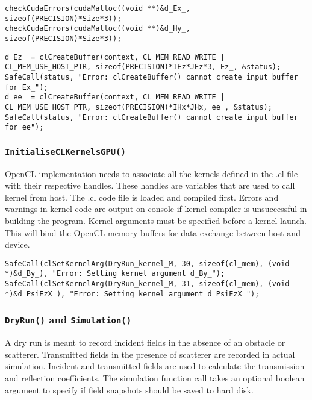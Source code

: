 \label{lst:CUDA-Host-Memory-Allocation}
\SingleSpacing
\begin{lstlisting}[caption={Device memory allocation in CUDA}]
checkCudaErrors(cudaMalloc((void **)&d_Ex_, sizeof(PRECISION)*Size*3));
checkCudaErrors(cudaMalloc((void **)&d_Hy_, sizeof(PRECISION)*Size*3));
\end{lstlisting}
\DoubleSpacing

\label{lst:OpenCL-Device-Memory-Buffers}
\SingleSpacing
\begin{lstlisting}[caption={Device memory allocation in OpenCL}]
d_Ez_ = clCreateBuffer(context, CL_MEM_READ_WRITE | CL_MEM_USE_HOST_PTR, sizeof(PRECISION)*IEz*JEz*3, Ez_, &status);
SafeCall(status, "Error: clCreateBuffer() cannot create input buffer for Ex_");
d_ee_ = clCreateBuffer(context, CL_MEM_READ_WRITE | CL_MEM_USE_HOST_PTR, sizeof(PRECISION)*IHx*JHx, ee_, &status);
SafeCall(status, "Error: clCreateBuffer() cannot create input buffer for ee");
\end{lstlisting}
\DoubleSpacing
\subsubsection{\texttt{InitialiseCLKernelsGPU()}}
OpenCL implementation needs to associate all the kernels defined in the .cl file with their respective handles. These handles are variables that are used to call kernel from host. The .cl code file is loaded and compiled first. Errors and warnings in kernel code are output on console if kernel compiler is unsuccessful in building the program. Kernel arguments must be specified before a kernel launch. This will bind the OpenCL memory buffers for data exchange between host and device.

\label{lst:OpenCL-Setting-Kernel-Arguments}
\SingleSpacing
\begin{lstlisting}[caption={Setting kernel arguments in OpenCL}]
SafeCall(clSetKernelArg(DryRun_kernel_M, 30, sizeof(cl_mem), (void *)&d_By_), "Error: Setting kernel argument d_By_");
SafeCall(clSetKernelArg(DryRun_kernel_M, 31, sizeof(cl_mem), (void *)&d_PsiEzX_), "Error: Setting kernel argument d_PsiEzX_");
\end{lstlisting}
\DoubleSpacing
\subsubsection{\texttt{DryRun()} and \texttt{Simulation()}}
A dry run is meant to record incident fields in the absence of an obstacle or scatterer. Transmitted fields in the presence of scatterer are recorded in actual simulation. Incident and transmitted fields are used to calculate the transmission and reflection coefficients. The simulation function call takes an optional boolean argument to specify if field snapshots should be saved to hard disk.
